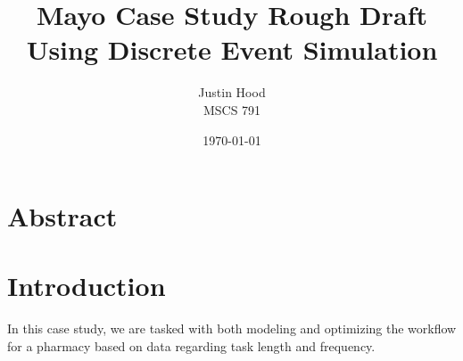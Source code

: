 \documentclass[11pt]{report}            %
\title{\bf Mayo Case Study Rough Draft\\
\large Using Discrete Event Simulation}  %
\author{Justin Hood\\
MSCS 791}              %
\date{\today}                           %
\begin{document}
\maketitle                              %
\setcounter{page}{2}                    %
\tableofcontents                        %
\newpage
\section*{Abstract}

\section*{Introduction}                %
In this case study, we are tasked with both modeling and optimizing the workflow for a pharmacy based on data regarding task length and frequency. 
%
%
\end{document}
